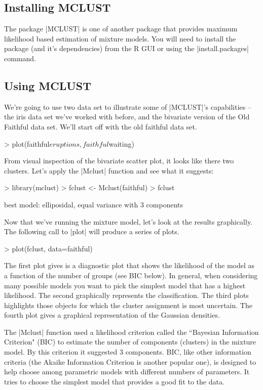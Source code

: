 \subsection{Installing MCLUST}
The package |MCLUST| is one of another package that provides maximum likelihood based estimation of mixture models.  You will need to install the package (and it's dependencies) from the R GUI or using the |install.packages| command.

\subsection{Using MCLUST}

We're going to use two data set to illustrate some of |MCLUST|'s capabilities -- the iris data set we've worked with before, and the bivariate version of the Old Faithful data set. We'll start off with  the old faithful data set.

\begin{R}
> plot(faithful$eruptions, faithful$waiting)    
\end{R}

From visual inspection of the bivariate scatter plot, it looks like there two clusters. Let's apply the |Mclust| function and see what it suggests:

\begin{R}
> library(mclust)
> fclust <- Mclust(faithful)
> fclust

 best model: elliposidal, equal variance with 3 components    
\end{R}

Now that we've running the mixture model, let's look at the results graphically. The following call to |plot| will produce a series of plots.

\begin{R}
> plot(fclust, data=faithful)    
\end{R}

The first plot gives is a diagnostic plot that shows the likelihood of the model as a function of  the number of groups (see BIC below). In general, when considering many possible models you want to pick the simplest model that has a highest likelihood. The second graphically represents the classification. The third plots highlights those objects for which the cluster assignment is most uncertain. The fourth plot gives a graphical representation of the Gaussian densities.

The |Mclust| function used a likelihood criterion called the ``Bayesian Information Criterion" (BIC) to estimate the number of components (clusters) in the mixture model. By this criterion it suggested 3 components. BIC, like other information criteria (the Akaike Information Criterion is another popular one), is designed to help choose among parametric models with different numbers of parameters. It tries to choose the simplest model that provides a good fit to the data.

